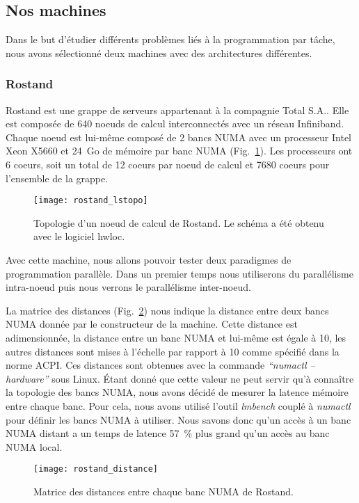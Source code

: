 \subsection{Nos machines}
Dans le but d'étudier différents problèmes liés à la programmation par tâche, nous avons sélectionné deux machines avec des architectures différentes.


\subsubsection{Rostand}
Rostand est une grappe de serveurs appartenant à la compagnie Total S.A..
%
Elle est composée de 640 noeuds de calcul interconnectés avec un réseau Infiniband.
%
Chaque noeud est lui-même composé de 2 bancs NUMA avec un processeur Intel Xeon X5660 et 24~Go de mémoire par banc NUMA (Fig.~\ref{fig:rostand}).
%
Les processeurs ont 6 coeurs, soit un total de 12 coeurs par noeud de calcul et 7680 coeurs pour l'ensemble de la grappe.


\begin{figure}[!h]
        \centering
        \texttt{[image: rostand\_lstopo]}
        \caption{Topologie d'un noeud de calcul de Rostand. Le schéma a été obtenu avec le logiciel hwloc.}
        \label{fig:rostand}
\end{figure}

Avec cette machine, nous allons pouvoir tester deux paradigmes de programmation parallèle.
%
Dans un premier temps nous utiliserons du parallélisme intra-noeud puis nous verrons le parallélisme inter-noeud.


La matrice des distances (Fig.~\ref{fig:rostand_distance}) nous indique la distance entre deux bancs NUMA donnée par le constructeur de la machine.
%
Cette distance est adimensionnée, la distance entre un banc NUMA et lui-même est égale à 10, les autres distances sont mises à l'échelle par rapport à 10 comme spécifié dans la norme ACPI.
%
Ces distances sont obtenues avec la commande {\em ``numactl --hardware''} sous Linux.
%
\'Etant donné que cette valeur ne peut servir qu'à connaître la topologie des bancs NUMA, nous avons décidé de mesurer la latence mémoire entre chaque banc.
%
Pour cela, nous avons utilisé l'outil {\em lmbench} couplé à {\em numactl} pour définir les bancs NUMA à utiliser.
%
Nous savons donc qu'un accès à un banc NUMA distant a un temps de latence 57~\% plus grand qu'un accès au banc NUMA local.


\begin{figure}[!h]
        \centering
        \texttt{[image: rostand\_distance]}
        \caption{Matrice des distances entre chaque banc NUMA de Rostand.}
        \label{fig:rostand_distance}
\end{figure}

